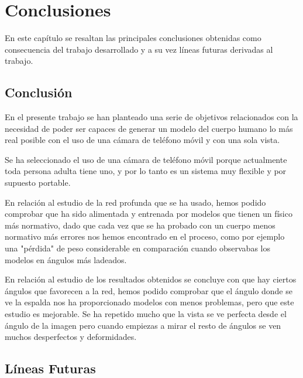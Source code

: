 
\chapter{Conclusiones}
\label{conclusiones}
En este capítulo se resaltan las principales conclusiones obtenidas como consecuencia del trabajo desarrollado y a su vez líneas futuras derivadas al trabajo.

\section{Conclusión}

En el presente trabajo se han planteado una serie de objetivos relacionados con la necesidad de poder ser capaces de generar un modelo del cuerpo humano lo más real posible con el uso de una cámara de teléfono móvil y con una sola vista. 

Se ha seleccionado el uso de una cámara de teléfono móvil porque actualmente toda persona adulta tiene uno, y por lo tanto es un sistema muy flexible y por supuesto portable.

En relación al estudio de la red profunda que se ha usado, hemos podido comprobar que ha sido alimentada y entrenada por modelos que tienen un físico más normativo, dado que cada vez que se ha probado con un cuerpo menos normativo más errores nos hemos encontrado en el proceso, como por ejemplo una "pérdida" de peso considerable en comparación cuando observabas los modelos en ángulos más ladeados.

En relación al estudio de los resultados obtenidos se concluye con que hay ciertos ángulos que favorecen a la red, hemos podido comprobar que el ángulo donde se ve la espalda nos ha proporcionado modelos con menos problemas, pero que este estudio es mejorable. Se ha repetido mucho que la vista se ve perfecta desde el ángulo de la imagen pero cuando empiezas a mirar el resto de ángulos se ven muchos desperfectos y deformidades.


\section{Líneas Futuras}

